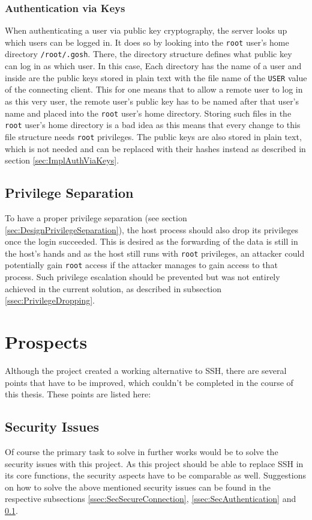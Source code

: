 \documentclass[10pt,a4paper,titlepage,twoside,english,final]{zhawreprt}
\begin{document}
\subsubsection{Authentication via Keys}\label{sssec:SecAuthViaKeys}
When authenticating a user via public key cryptography, the server looks up which users can be logged in.
It does so by looking into the \texttt{root} user's home directory \texttt{/root/.gosh}.
There, the directory structure defines what public key can log in as which user.
In this case, Each directory has the name of a user and inside are the public keys stored in plain text with the file name of the \texttt{USER} value of the connecting client.
This for one means that to allow a remote user to log in as this very user, the remote user's public key has to be named after that user's name and placed into the \texttt{root} user's home directory.
Storing such files in the \texttt{root} user's home directory is a bad idea as this means that every change to this file structure needs \texttt{root} privileges.
The public keys are also stored in plain text, which is not needed and can be replaced with their hashes instead as described in section \ref{sec:ImplAuthViaKeys}.

\subsection{Privilege Separation}\label{ssec:SecPrivilegeSeparation}
To have a proper privilege separation (see section \ref{sec:DesignPrivilegeSeparation}), the host process should also drop its privileges once the \gls{login} succeeded.
This is desired as the forwarding of the data is still in the host's hands and as the host still runs with \texttt{root} privileges, an attacker could potentially gain \texttt{root} access if the attacker manages to gain access to that process.
Such privilege escalation should be prevented but was not entirely achieved in the current solution, as described in subsection \ref{ssec:PrivilegeDropping}.


\section{Prospects}\label{sec:Prospects}
Although the project created a working alternative to \gls{SSH}, there are several points that have to be improved, which couldn't be completed in the course of this thesis.
These points are listed here:

\subsection{Security Issues}\label{ssec:SecurityIssues}
Of course the primary task to solve in further works would be to solve the security issues with this project.
As this project should be able to replace \gls{SSH} in its core functions, the security aspects have to be comparable as well.
Suggestions on how to solve the above mentioned security issues can be found in the respective subsections \ref{ssec:SecSecureConnection}, \ref{ssec:SecAuthentication} and \ref{ssec:SecPrivilegeSeparation}.
\end{document}
